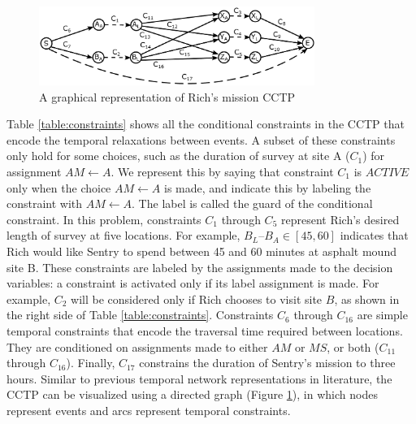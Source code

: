 \documentclass[jair,twoside,11pt,theapa]{article}
\begin{document}
\begin{figure}[h!]
	\centering
	\includegraphics[width=0.80\textwidth]{figures/example_cctp.pdf}  
	\caption{A graphical representation of Rich's mission CCTP}
	\label{fig:example_cctp}
\end{figure}


%
%


Table \ref{table:constraints} shows all the conditional constraints in the CCTP
that encode the temporal relaxations between events. A subset of these constraints only hold for some choices, such as the duration of survey at site A ($C_1$) for assignment $AM\leftarrow A$. We represent this by saying that constraint $C_1$ is $ACTIVE$ only when the choice $AM\leftarrow A$ is made, and indicate this by labeling the constraint with $AM\leftarrow A$.  The label is called the guard of the conditional constraint. In this problem, constraints $C_1$ through
$C_5$ represent Rich's desired length of survey at
five locations. For example, $B_L$--$B_A\in [45,60]$ indicates that Rich would like
Sentry to spend between 45 and 60 minutes at asphalt mound site B. These constraints are labeled
by the assignments made to the decision variables: a constraint is activated
only if its label assignment is made. For example, $C_2$ will be considered only
if Rich chooses to visit site $B$, as shown in the right side of Table
\ref{table:constraints}. Constraints $C_6$ through $C_{16}$ are simple temporal
constraints that encode the traversal time required between locations. They are
conditioned on assignments made to either $AM$ or $MS$, or both ($C_{11}$
through $C_{16}$). Finally, $C_{17}$ constrains the duration of Sentry's mission
to three hours. Similar to previous temporal network representations in
literature, the CCTP can be visualized using a directed graph (Figure
\ref{fig:example_cctp}), in which nodes represent events and arcs represent temporal constraints.
\end{document}
